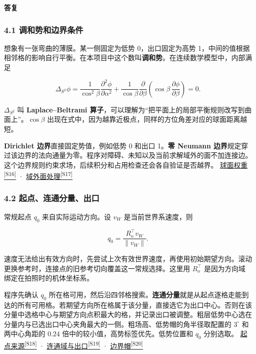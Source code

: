 \documentclass[11pt,a4paper]{article}
\numberwithin{equation}{topic}
\newenvironment{reply}{%
  \par\noindent\textcolor{replycolor}{\sffamily\bfseries 答复}\par\nobreak\ignorespaces
}{\par\medskip}
\newcommand{\sourceref}[2]{\hyperlink{source-#1}{#2\textsuperscript{[#1]}}}
\begin{document}
\begin{reply}
\subsubsection*{4.1 调和势和边界条件}

想象有一张弯曲的薄膜。某一侧固定为低势 0，出口固定为高势 1，中间的值根据相邻格的影响自行平衡。在本项目中这个数叫\textbf{调和势}。在连续数学模型中，内部满足

\begin{equation}
\label{eq:laplace}
\Delta_{S^2}\phi
=\frac{1}{\cos^2\beta}\frac{\partial^2\phi}{\partial\alpha^2}
+\frac{1}{\cos\beta}\frac{\partial}{\partial\beta}
\left(\cos\beta\,\frac{\partial\phi}{\partial\beta}\right)=0.
\end{equation}

\(\Delta_{S^2}\) 叫 \textbf{Laplace–Beltrami 算子}，可以理解为“把平面上的局部平衡规则改写到曲面上”。\(\cos\beta\) 出现在式中，因为越靠近极点，同样的方位角差对应的球面距离越短。

\textbf{Dirichlet 边界}直接固定势值，例如低势 0 和出口 1。\textbf{零 Neumann 边界}规定穿过该边界的法向通量为零。程序对障碍、未知以及当前求解域外的面不加连接边。这个边界规则约束求场，后续积分和占用检查还会各自验证是否越界。 \sourceref{S16}{球面权重} · \sourceref{S17}{域外面处理}

\subsubsection*{4.2 起点、连通分量、出口}

常规起点 \(q_0\) 来自实际运动方向。设 \(v_W\) 是当前世界系速度，则

\begin{equation}
\label{eq:start}
q_0=\frac{R_o^\top v_W}{\|v_W\|}.
\end{equation}

速度无法给出有效方向时，先尝试上次有效世界速度，再使用初始期望方向。滚动更换参考时，连接点的旧参考切向覆盖这一常规选择。这里用 \(R_o^\top\) 是因为方向域绑定在拍照时的机体坐标系。

程序先确认 \(q_0\) 所在格可用，然后沿四邻格搜索。\textbf{连通分量}就是从起点逐格走能到达的所有可用格。若期望方向所在格属于该分量，直接选它为出口中心。否则在该分量中选格中心与期望方向点积最大的格，并记录出口被调整。粗层低势中心选在分量内与已选出口中心夹角最大的一侧。粗场高、低势帽的角半径取配置的 \(3^\circ\) 和两中心角距的 \(0.24\) 倍中的较小值，高势标签优先。低势位置和 \(q_0\) 分别选取。 \sourceref{S18}{起点来源} · \sourceref{S19}{连通域与出口} · \sourceref{S20}{边界帽}


\end{reply}
\end{document}
